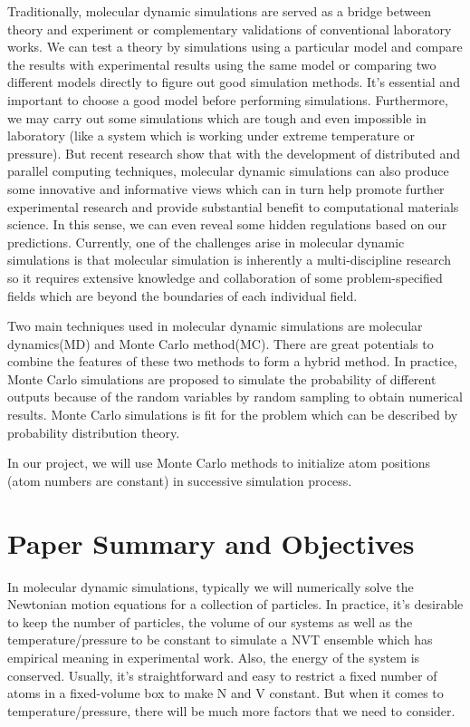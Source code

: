 \documentclass{article}
\begin{document}
\begin{spacing}{1}
Traditionally, molecular dynamic simulations are served as a bridge between theory and experiment or complementary validations of conventional laboratory works. We can test a theory by simulations using a particular model and compare the results with experimental results using the same model or comparing two different models directly to figure out good simulation methods. It’s essential and important to choose a good model before performing simulations. Furthermore, we may carry out some simulations which are tough and even impossible in laboratory (like a system which is working under extreme temperature or pressure). But recent research show that with the development of distributed and parallel computing techniques, molecular dynamic simulations can also produce some innovative and informative views which can in turn help promote further experimental research and provide substantial benefit to computational materials science. In this sense, we can even reveal some hidden regulations based on our predictions. Currently, one of the challenges arise in molecular dynamic simulations is that molecular simulation is inherently a multi-discipline research so it requires extensive knowledge and collaboration of some problem-specified fields which are beyond the boundaries of each individual field.

Two main techniques used in molecular dynamic simulations are molecular dynamics(MD) and Monte Carlo method(MC). There are great potentials to combine the features of these two methods to form a hybrid method. In practice, Monte Carlo simulations are proposed to simulate the probability of different outputs because of the random variables by random sampling to obtain numerical results. Monte Carlo simulations is fit for the problem which can be described by probability distribution theory.

In our project, we will use Monte Carlo methods to initialize atom positions (atom numbers are constant) in successive simulation process. 


\section{Paper Summary and Objectives}
In molecular dynamic simulations, typically we will numerically solve the Newtonian motion equations for a collection of particles. In practice, it’s desirable to keep the number of particles, the volume of our systems as well as the temperature/pressure to be constant to simulate a NVT ensemble which has empirical meaning in experimental work. Also, the energy of the system is conserved.  Usually, it’s straightforward and easy to restrict a fixed number of atoms in a fixed-volume box to make N and V constant. But when it comes to temperature/pressure, there will be much more factors that we need to consider. 


\end{spacing}
\end{document}
